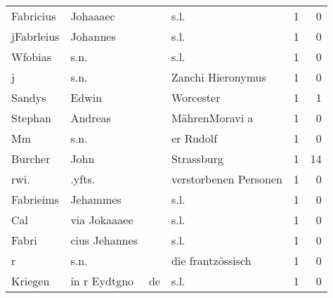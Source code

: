 \begin{tabular}{llllrr}
                Fabricius &                           Johaaaec &             &                                        s.l. &          1 &         0 \\
               jFabrleius &                           Johannes &             &                                        s.l. &          1 &         0 \\
                  Wfobias &                               s.n. &             &                                        s.l. &          1 &         0 \\
                        j &                               s.n. &             &                           Zanchi Hieronymus &          1 &         0 \\
                   Sandys &                              Edwin &             &                                   Worcester &          1 &         1 \\
                  Stephan &                            Andreas &             &                              MährenMoravi a &          1 &         0 \\
                       Mm &                               s.n. &             &                                   er Rudolf &          1 &         0 \\
                  Burcher &                               John &             &                                  Strassburg &          1 &        14 \\
                     rwi. &                             .yfts. &             &                       verstorbenen Personen &          1 &         0 \\
                Fabrieims &                           Jehammes &             &                                        s.l. &          1 &         0 \\
                      Cal &                       via Jokaaaee &             &                                        s.l. &          1 &         0 \\
                    Fabri &                      cius Jehannes &             &                                        s.l. &          1 &         0 \\
                        r &                               s.n. &             &                           die frantzössisch &          1 &         0 \\
                  Kriegen &                       in r Eydtgno &          de &                                        s.l. &          1 &         0 \\

\end{tabular}
